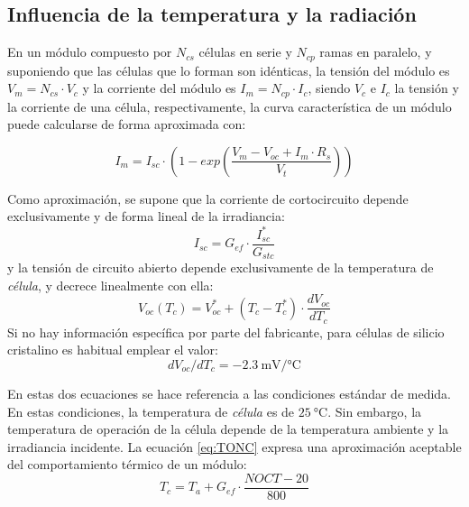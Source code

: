 \subsection{Influencia de la temperatura y la radiación}

En un módulo compuesto por $N_{cs}$ células en serie y $N_{cp}$
ramas en paralelo, y suponiendo que las células que lo forman son
idénticas, la tensión del módulo es $V_{m}=N_{cs}\cdot V_{c}$ y la
corriente del módulo es $I_{m}=N_{cp}\cdot I_{c}$, siendo $V_{c}$
e $I_{c}$ la tensión y la corriente de una célula, respectivamente,
la curva característica de un módulo puede calcularse de forma aproximada
con:

\begin{equation}
I_{m}=I_{sc}\cdot\left(1-exp\left(\frac{V_{m}-V_{oc}+I_{m}\cdot
      R_{s}}{V_{t}}\right)\right)
\end{equation}


Como aproximación, se supone que la corriente de cortocircuito depende
exclusivamente y de forma lineal de la irradiancia:
\begin{equation}
I_{sc}=G_{ef}\cdot\frac{I_{sc}^{*}}{G_{stc}}
\end{equation}
y la tensión de circuito abierto depende exclusivamente de la temperatura
de \emph{célula}, y decrece linealmente con ella:
\begin{equation}
V_{oc}(T_{c})=V_{oc}^{*}+(T_{c}-T_{c}^{*})\cdot\frac{dV_{oc}}{dT_{c}}
\end{equation}
Si no hay información específica por parte del
fabricante, para células de silicio cristalino es habitual emplear el valor:
\begin{equation}
dV_{oc}/dT_{c} = \SI{-2.3}{\milli\volt\per\celsius}
\label{eq:VocTemperatura}
\end{equation}

En estas dos ecuaciones se hace referencia a las condiciones estándar
de medida. En estas condiciones, la temperatura de \emph{célula} es
de $\SI{25}{\celsius}$. Sin embargo, la temperatura de operación
de la célula depende de la temperatura ambiente y la irradiancia incidente.
La ecuación \ref{eq:TONC} expresa una aproximación aceptable del
comportamiento térmico de un módulo:\begin{equation}
T_{c}=T_{a}+G_{ef}\cdot\frac{NOCT-20}{800}\label{eq:TONC}\end{equation}

